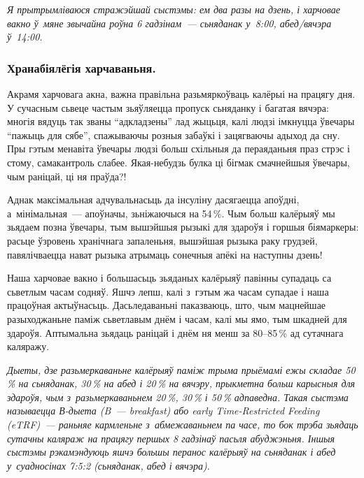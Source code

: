 \emph{Я прытрымліваюся стражэйшай сыстэмы: ем два разы на дзень, і харчовае вакно ў~мяне звычайна роўна 6 гадзінам~--- сьняданак у~8:00, абед/вячэра ў~14:00.}


\subsubsection{Хранабіялёгія харчаваньня.}
Акрамя харчовага акна, важна правільна разьмяркоўваць калёрыі на працягу дня. У сучасным сьвеце частым зьяўляецца пропуск сьняданку і багатая вячэра: многія вядуць так званы ``адкладзены'' лад жыцьця, калі людзі імкнуцца ўвечары ``пажыць для сябе'', спажываючы розныя забаўкі і зацягваючы адыход да сну. Пры гэтым менавіта ўвечары людзі больш схільныя да пераяданьня праз стрэс і стому, самакантроль слабее. Якая-небудзь булка ці бігмак смачнейшыя ўвечары, чым раніцай, ці ня праўда?!

Аднак максімальная адчувальнасьць да інсуліну дасягаецца апоўдні, а~мінімальная~--- апоўначы, зьніжаючыся на 54\,\%. Чым больш калёрыяў мы зьядаем позна ўвечары, тым вышэйшыя рызыкі для здароўя і горшыя біямаркеры: расьце ўзровень хранічнага запаленьня, вышэйшая рызыка раку грудзей, павялічваецца нават рызыка атрымаць сонечныя апёкі на наступны дзень!

Наша харчовае вакно і большасьць зьяданых калёрыяў павінны супадаць са сьветлым часам содняў. Яшчэ лепш, калі з~гэтым жа часам супадае і наша працоўная актыўнасьць. Дасьледаваньні паказваюць, што, чым мацнейшае разыходжаньне паміж сьветлавым днём і часам, калі мы ямо, тым шкадней для здароўя. Аптымальна зьядаць раніцай і днём ня менш за 80--85\,\% ад сутачнага каляражу.

\emph{Дыеты, дзе разьмеркаваньне калёрыяў паміж трыма прыёмамі ежы складае 50\,\% на сьняданак, 30\,\% на абед і 20\,\% на вячэру, прыкметна больш карысныя для здароўя, чым з~разьмеркаваньнем 20\,\%, 30\,\% і 50\,\% адпаведна. Такая сыстэма называецца В-дыета (B~--- breakfast) або early Time-Restricted Feeding (eTRF)~--- раньняе кармленьне з~абмежаваньнем па часе, то бок трэба зьядаць сутачны каляраж на працягу першых 8 гадзінаў пасьля абуджэньня. Іншыя сыстэмы рэкамэндуюць яшчэ большы перанос калёрыяў на сьняданак і абед у~суадносінах 7:5:2 (сьняданак, абед і вячэра).}

